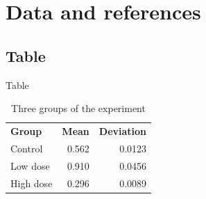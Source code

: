 \documentclass[aspectratio=1610,xcolor=dvipsnames]{beamer}
\begin{document}
\section{Data and references}

\subsection{Table}
\begin{frame}{Table}
    \begin{table}
        \begin{tabular}{l r r}
            \textbf{Group} & \textbf{Mean} & \textbf{Deviation} \\
            \headrule
            Control             & 0.562               & 0.0123              \\ \hline
            Low dose            & 0.910               & 0.0456              \\ \hline
            High dose           & 0.296               & 0.0089              \\
        \end{tabular}
        \caption{Three groups of the experiment}
    \end{table}
\end{frame}
\end{document}
